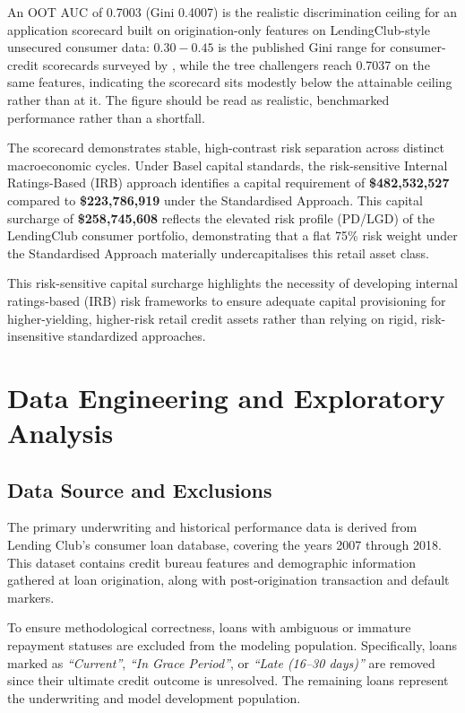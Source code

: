 \documentclass[11pt,a4paper]{article}
\begin{document}
An OOT AUC of 0.7003 (Gini 0.4007) is the realistic discrimination ceiling for an application scorecard built on origination-only features on LendingClub-style unsecured consumer data: $0.30 - 0.45$ is the published Gini range for consumer-credit scorecards surveyed by \textcite{lessmann2015benchmarking}, while the tree challengers reach 0.7037 on the same features, indicating the scorecard sits modestly below the attainable ceiling rather than at it. The figure should be read as realistic, benchmarked performance rather than a shortfall.

The scorecard demonstrates stable, high-contrast risk separation across distinct macroeconomic cycles. Under Basel capital standards, the risk-sensitive Internal Ratings-Based (IRB) approach identifies a capital requirement of \textbf{\$482,532,527} compared to \textbf{\$223,786,919} under the Standardised Approach. This capital surcharge of \textbf{\$258,745,608} reflects the elevated risk profile (PD/LGD) of the LendingClub consumer portfolio, demonstrating that a flat 75\% risk weight under the Standardised Approach materially undercapitalises this retail asset class.

This risk-sensitive capital surcharge highlights the necessity of developing internal ratings-based (IRB) risk frameworks \parencite{bcbs2004} to ensure adequate capital provisioning for higher-yielding, higher-risk retail credit assets rather than relying on rigid, risk-insensitive standardized approaches.

\section{Data Engineering and Exploratory Analysis}

\subsection{Data Source and Exclusions}
The primary underwriting and historical performance data is derived from Lending Club's consumer loan database, covering the years 2007 through 2018. This dataset contains credit bureau features and demographic information gathered at loan origination, along with post-origination transaction and default markers.

To ensure methodological correctness, loans with ambiguous or immature repayment statuses are excluded from the modeling population. Specifically, loans marked as \textit{``Current''}, \textit{``In Grace Period''}, or \textit{``Late (16--30 days)''} are removed since their ultimate credit outcome is unresolved. The remaining loans represent the underwriting and model development population.
\end{document}
